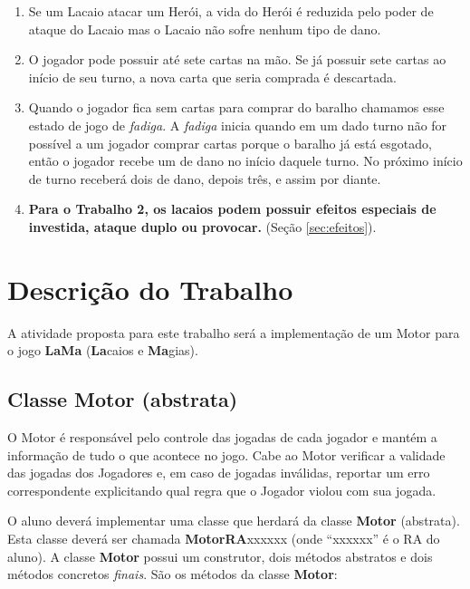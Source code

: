 \documentclass[10pt]{article}
\begin{document}
\begin{enumerate}
    \item Se um Lacaio atacar um Herói, a vida do Herói é reduzida pelo poder de ataque do Lacaio mas o Lacaio não sofre nenhum tipo de dano. 
    \item O jogador pode possuir até sete cartas na mão. Se já possuir sete cartas ao início de seu turno, a nova carta que seria comprada é descartada.
    \item  Quando o jogador fica sem cartas para comprar do baralho chamamos esse estado de jogo de \textit{fadiga}. A \textit{fadiga} inicia quando em um dado turno não for possível a um jogador comprar cartas porque o baralho já está esgotado, então o jogador recebe um de dano no início daquele turno. No próximo início de turno receberá dois de dano, depois três, e assim por diante.
    \item  \textbf{Para o Trabalho 2, os lacaios podem possuir efeitos especiais de investida, ataque duplo ou provocar.} (Seção \ref{sec:efeitos}).
\end{enumerate}

\section{Descrição do Trabalho}

A atividade proposta para este trabalho será a implementação de um Motor para o jogo \textbf{LaMa} (\textbf{La}caios e \textbf{Ma}gias).

\subsection{Classe Motor (abstrata)}

O Motor é responsável pelo controle das jogadas de cada jogador e mantém a informação de tudo o que acontece no jogo. Cabe ao Motor verificar a validade das jogadas dos Jogadores e, em caso de jogadas inválidas, reportar um erro correspondente explicitando qual regra que o Jogador violou com sua jogada.

O aluno deverá implementar uma classe que herdará da classe \textbf{Motor} (abstrata). Esta classe deverá ser chamada \textbf{MotorRA}xxxxxx (onde ``xxxxxx'' é o RA do aluno). A classe \textbf{Motor} possui um construtor, dois métodos abstratos e dois métodos concretos \textit{finais}. São os métodos da classe \textbf{Motor}:
\end{document}
